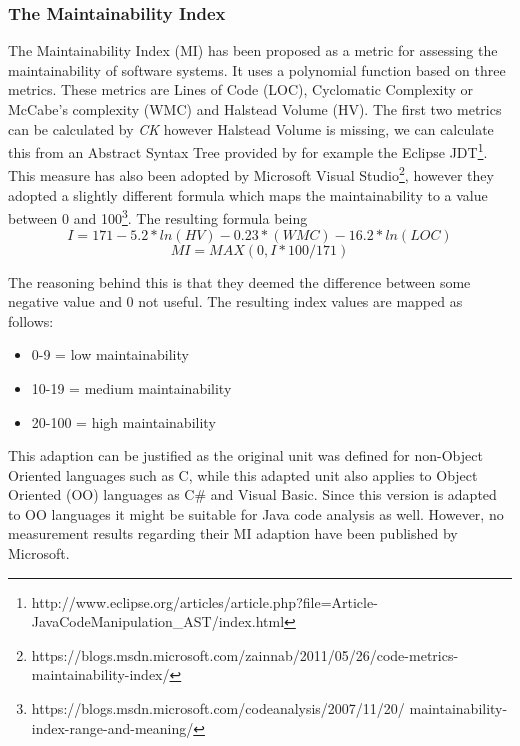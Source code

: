 \subsubsection{The Maintainability Index} The Maintainability Index (MI) has been proposed as a metric for assessing the maintainability of software systems. It uses a polynomial function based on three metrics. These metrics are Lines of Code (LOC), Cyclomatic Complexity or McCabe's complexity (WMC) and Halstead Volume (HV). The first two metrics can be calculated by \textit{CK} however Halstead Volume is missing, we can calculate this from an Abstract Syntax Tree provided by for example the Eclipse JDT\footnote{http://www.eclipse.org/articles/article.php?file=Article-JavaCodeManipulation\_AST/index.html}. This measure has also been adopted by Microsoft Visual Studio\footnote{https://blogs.msdn.microsoft.com/zainnab/2011/05/26/code-metrics-maintainability-index/}, however they adopted a slightly different formula which maps the maintainability to a value between 0 and 100\footnote{https://blogs.msdn.microsoft.com/codeanalysis/2007/11/20/ maintainability-index-range-and-meaning/}. The resulting formula being
\begin{displaymath}
I = 171 - 5.2 * ln(HV) - 0.23 * (WMC) - 16.2 * ln(LOC)
\end{displaymath}
\begin{displaymath}
MI = MAX(0,I*100 / 171)
\end{displaymath}

The reasoning behind this is that they deemed the difference between some negative value and 0 not useful. The resulting index values are mapped as follows:
\begin{itemize}
    \item 0-9 = low maintainability
    \item 10-19 = medium maintainability
    \item 20-100 = high maintainability
\end{itemize}
This adaption can be justified as the original unit was defined for non-Object Oriented languages such as C, while this adapted unit also applies to Object Oriented (OO) languages as C\# and Visual Basic. Since this version is adapted to OO languages it might be suitable for Java code analysis as well. However, no measurement results regarding their MI adaption have been published by Microsoft.
